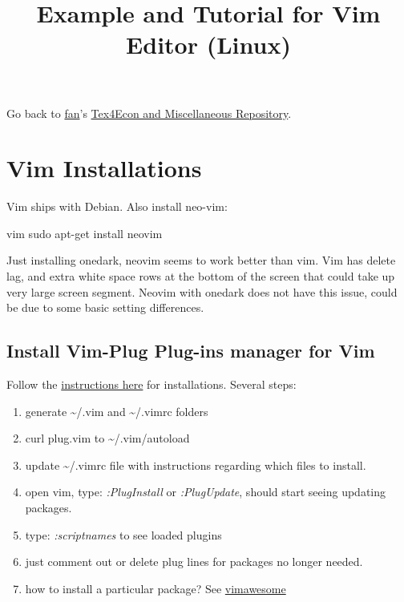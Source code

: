\documentclass[]{article}
\title{Example and Tutorial for Vim Editor (Linux)}
\author{}
\date{\vspace{-2.5em}}
\newenvironment{Shaded}{\begin{snugshade}}{\end{snugshade}}
\newcommand{\ExtensionTok}[1]{#1}
\newcommand{\FunctionTok}[1]{\textcolor[rgb]{0.00,0.00,0.00}{#1}}
\newcommand{\NormalTok}[1]{#1}
\providecommand{\tightlist}{%
  \setlength{\itemsep}{0pt}\setlength{\parskip}{0pt}}
\begin{document}
\maketitle

Go back to \href{http://fanwangecon.github.io/}{fan}'s
\href{http://fanwangecon.github.io/Tex4Econ/}{Tex4Econ and Miscellaneous
Repository}.

\hypertarget{vim-installations}{%
\section{Vim Installations}\label{vim-installations}}

Vim ships with Debian. Also install neo-vim:

\begin{Shaded}
\begin{Highlighting}[]
\ExtensionTok{vim}
\FunctionTok{sudo}\NormalTok{ apt-get install neovim}
\end{Highlighting}
\end{Shaded}

Just installing onedark, neovim seems to work better than vim. Vim has
delete lag, and extra white space rows at the bottom of the screen that
could take up very large screen segment. Neovim with onedark does not
have this issue, could be due to some basic setting differences.

\hypertarget{install-vim-plug-plug-ins-manager-for-vim}{%
\subsection{Install Vim-Plug Plug-ins manager for
Vim}\label{install-vim-plug-plug-ins-manager-for-vim}}

Follow the
\href{https://github.com/junegunn/vim-plug/wiki/tutorial}{instructions
here} for installations. Several steps:

\begin{enumerate}
\def\labelenumi{\arabic{enumi}.}
\tightlist
\item
  generate \textasciitilde{}/.vim and \textasciitilde{}/.vimrc folders
\item
  curl plug.vim to \textasciitilde{}/.vim/autoload
\item
  update \textasciitilde{}/.vimrc file with instructions regarding which
  files to install.
\item
  open vim, type: \emph{:PlugInstall} or \emph{:PlugUpdate}, should
  start seeing updating packages.
\item
  type: \emph{:scriptnames} to see loaded plugins
\item
  just comment out or delete plug lines for packages no longer needed.
\item
  how to install a particular package? See
  \href{https://vimawesome.com/plugin/onedark-vim}{vimawesome}
\end{enumerate}
\end{document}

